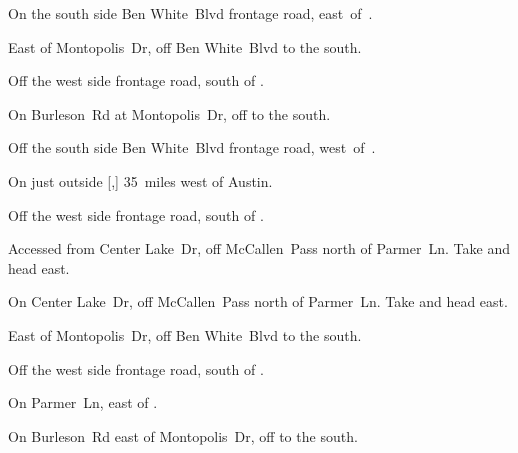 
\begin{LocationList}

On the south side  Ben White~Blvd frontage road, east~of~.

East of Montopolis~Dr, off  Ben White~Blvd to the south.

\Location{\GarageHQ \Garage}
Off the west side  frontage road, south of .

\Location{\GasStation \Gas \Rest}
On Burleson~Rd at Montopolis~Dr, off  to the south.

Off the south side  Ben White~Blvd frontage road, west~of~.

On  just outside [,] 35~miles west of Austin.

Off the west side  frontage road, south of .

Accessed from Center Lake~Dr, off McCallen~Pass north of  Parmer~Ln.
Take   and head east.

On Center Lake~Dr, off McCallen~Pass north of  Parmer~Ln.
Take   and head east.

East of Montopolis~Dr, off  Ben White~Blvd to the south.

Off the west side  frontage road, south of .

On  Parmer~Ln, east of  .

On Burleson~Rd east of Montopolis~Dr, off  to the south.

\end{LocationList}
